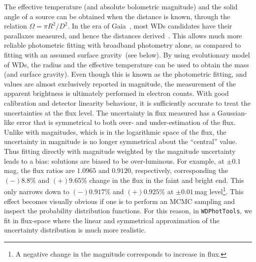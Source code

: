 \documentclass[fleqn,usenatbib]{rasti}
\begin{document}
The effective temperature (and absolute bolometric magnitude) and the solid
angle of a source can be obtained when the distance is known, through the
relation $\Omega = \pi R^2 / D^2$. In the era of
Gaia~\citep{2021A&A...649A...1G}, most WDs candidates have their parallaxes
measured, and hence the distances derived~\citep{2021AJ....161..147B}. This
allows much more reliable photometric fitting with broadband photometry alone,
as compared to fitting with an assumed surface gravity~(see below). By using
evolutionary model of WDs, the radius and the effective temperature can be
used to obtain the mass (and surface gravity). Even though this is known as
the photometric fitting, and values are almost exclusively reported in
magnitude, the measurement of the apparent brightness is ultimately performed
in electron counts. With good calibration and detector linearity behaviour, it
is sufficiently accurate to treat the uncertainties at the flux level. The
uncertainty in flux measured has a Gaussian-like error that is symmetrical
to both over- and under-estimation of the flux. Unlike with magnitudes,
which is in the logarithmic space of the flux, the uncertainty in magnitude
is no longer symmetrical about the ``central'' value. Thus fitting directly
with magnitude weighted by the magnitude uncertainty leads to a bias: solutions
are biased to be over-luminous. For example, at $\pm0.1$\,mag, the flux
ratios are $1.0965$ and $0.9120$, respectively, corresponding the $(-)8.8\%$
and $(+)9.65\%$ change in the flux in the faint and bright end. This only
narrows down to $(-)0.917\%$ and $(+)0.925\%$ at $\pm0.01\,$mag
level\footnote{A negative change in the magnitude corresponds to increase in
flux.}. This effect becomes visually obvious if one is to perform an MCMC
sampling and inspect the probability distribution functions. For this reason,
in \verb+WDPhotTools+, we fit in flux-space where the linear and symmetrical
approximation of the uncertainty distribution is much more realistic.
\end{document}
